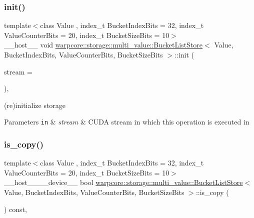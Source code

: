 \subsubsection{\texorpdfstring{init()}{init()}}
{\footnotesize\ttfamily template$<$class Value , index\+\_\+t Bucket\+Index\+Bits = 32, index\+\_\+t Value\+Counter\+Bits = 20, index\+\_\+t Bucket\+Size\+Bits = 10$>$ \\
\+\_\+\+\_\+host\+\_\+\+\_\+ void \hyperlink{classwarpcore_1_1storage_1_1multi__value_1_1BucketListStore}{warpcore\+::storage\+::multi\+\_\+value\+::\+Bucket\+List\+Store}$<$ Value, Bucket\+Index\+Bits, Value\+Counter\+Bits, Bucket\+Size\+Bits $>$\+::init (\begin{DoxyParamCaption}\item[{const cuda\+Stream\+\_\+t}]{stream = {} }\end{DoxyParamCaption})\hspace{0.3cm}{\ttfamily [inline]}, {\ttfamily [noexcept]}}



(re)initialize storage 


\begin{DoxyParams}[1]{Parameters}
\mbox{\tt in}  & {\em stream} & C\+U\+DA stream in which this operation is executed in \\
\hline
\end{DoxyParams}
\mbox{\label{classwarpcore_1_1storage_1_1multi__value_1_1BucketListStore_aa4ac88f26d621b59508ec65c6f31fbec}} 
\subsubsection{\texorpdfstring{is\+\_\+copy()}{is\_copy()}}
{\footnotesize\ttfamily template$<$class Value , index\+\_\+t Bucket\+Index\+Bits = 32, index\+\_\+t Value\+Counter\+Bits = 20, index\+\_\+t Bucket\+Size\+Bits = 10$>$ \\
\+\_\+\+\_\+host\+\_\+\+\_\+\+\_\+\+\_\+device\+\_\+\+\_\+ bool \hyperlink{classwarpcore_1_1storage_1_1multi__value_1_1BucketListStore}{warpcore\+::storage\+::multi\+\_\+value\+::\+Bucket\+List\+Store}$<$ Value, Bucket\+Index\+Bits, Value\+Counter\+Bits, Bucket\+Size\+Bits $>$\+::is\+\_\+copy (\begin{DoxyParamCaption}{ }\end{DoxyParamCaption}) const\hspace{0.3cm}{\ttfamily [inline]}, {\ttfamily [noexcept]}}



